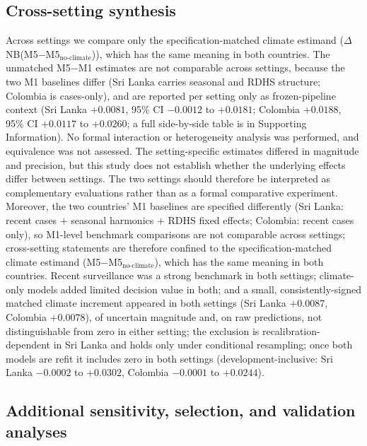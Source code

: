 \documentclass[11pt,a4paper]{article}
\begin{document}
\subsection{Cross-setting synthesis}
Across settings we compare only the specification-matched climate estimand ($\Delta$NB(M5$-$M5$_{\text{no-climate}}$)), which has the same meaning in both countries. The unmatched M5$-$M1 estimates are not comparable across settings, because the two M1 baselines differ (Sri Lanka carries seasonal and RDHS structure; Colombia is cases-only), and are reported per setting only as frozen-pipeline context (Sri Lanka $+0.0081$, 95\% CI $-0.0012$ to $+0.0181$; Colombia $+0.0188$, 95\% CI $+0.0117$ to $+0.0260$; a full side-by-side table is in Supporting Information). No formal interaction or heterogeneity analysis was performed, and equivalence was not assessed. The setting-specific estimates differed in magnitude and precision, but this study does not establish whether the underlying effects differ between settings. The two settings should therefore be interpreted as complementary evaluations rather than as a formal comparative experiment. Moreover, the two countries' M1 baselines are specified differently (Sri Lanka: recent cases $+$ seasonal harmonics $+$ RDHS fixed effects; Colombia: recent cases only), so M1-level benchmark comparisons are not comparable across settings; cross-setting statements are therefore confined to the specification-matched climate estimand (M5$-$M5$_{\text{no-climate}}$), which has the same meaning in both countries. Recent surveillance was a strong benchmark in both settings; climate-only models added limited decision value in both; and a small, consistently-signed matched climate increment appeared in both settings (Sri Lanka $+0.0087$, Colombia $+0.0078$), of uncertain magnitude and, on raw predictions, not distinguishable from zero in either setting; the exclusion is recalibration-dependent in Sri Lanka and holds only under conditional resampling; once both models are refit it includes zero in both settings (development-inclusive: Sri Lanka $-0.0002$ to $+0.0302$, Colombia $-0.0001$ to $+0.0244$).


\subsection{Additional sensitivity, selection, and validation analyses}
\end{document}
